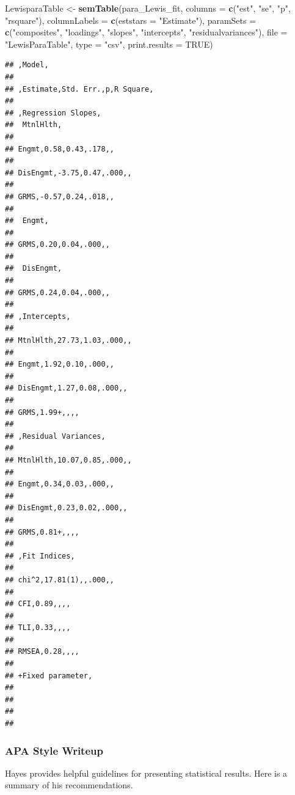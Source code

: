 \documentclass[
  11pt,
]{book}
\newenvironment{Shaded}{\begin{snugshade}}{\end{snugshade}}
\newcommand{\AttributeTok}[1]{\textcolor[rgb]{0.27,0.27,0.27}{#1}}
\newcommand{\ConstantTok}[1]{\textcolor[rgb]{0.37,0.37,0.37}{#1}}
\newcommand{\FunctionTok}[1]{\textcolor[rgb]{0.27,0.27,0.27}{\textbf{#1}}}
\newcommand{\NormalTok}[1]{#1}
\newcommand{\OtherTok}[1]{\textcolor[rgb]{0.37,0.37,0.37}{#1}}
\newcommand{\StringTok}[1]{\textcolor[rgb]{0.5,0.5,0.5}{#1}}
\begin{document}
\begin{Shaded}
\begin{Highlighting}[]
\NormalTok{LewisparaTable }\OtherTok{\textless{}{-}} \FunctionTok{semTable}\NormalTok{(para\_Lewis\_fit, }\AttributeTok{columns =} \FunctionTok{c}\NormalTok{(}\StringTok{"est"}\NormalTok{, }\StringTok{"se"}\NormalTok{, }\StringTok{"p"}\NormalTok{,}
    \StringTok{"rsquare"}\NormalTok{), }\AttributeTok{columnLabels =} \FunctionTok{c}\NormalTok{(}\AttributeTok{eststars =} \StringTok{"Estimate"}\NormalTok{), }\AttributeTok{paramSets =} \FunctionTok{c}\NormalTok{(}\StringTok{"composites"}\NormalTok{,}
    \StringTok{"loadings"}\NormalTok{, }\StringTok{"slopes"}\NormalTok{, }\StringTok{"intercepts"}\NormalTok{, }\StringTok{"residualvariances"}\NormalTok{), }\AttributeTok{file =} \StringTok{"LewisParaTable"}\NormalTok{,}
    \AttributeTok{type =} \StringTok{"csv"}\NormalTok{, }\AttributeTok{print.results =} \ConstantTok{TRUE}\NormalTok{)}
\end{Highlighting}
\end{Shaded}

\begin{verbatim}
## ,Model,
##  
## ,Estimate,Std. Err.,p,R Square,
## 
## ,Regression Slopes,
##  MtnlHlth,
## 
## Engmt,0.58,0.43,.178,,
## 
## DisEngmt,-3.75,0.47,.000,,
## 
## GRMS,-0.57,0.24,.018,,
## 
##  Engmt,
## 
## GRMS,0.20,0.04,.000,,
## 
##  DisEngmt,
## 
## GRMS,0.24,0.04,.000,,
## 
## ,Intercepts,
## 
## MtnlHlth,27.73,1.03,.000,,
## 
## Engmt,1.92,0.10,.000,,
## 
## DisEngmt,1.27,0.08,.000,,
## 
## GRMS,1.99+,,,,
## 
## ,Residual Variances,
## 
## MtnlHlth,10.07,0.85,.000,,
## 
## Engmt,0.34,0.03,.000,,
## 
## DisEngmt,0.23,0.02,.000,,
## 
## GRMS,0.81+,,,,
## 
## ,Fit Indices,
## 
## chi^2,17.81(1),,.000,,
## 
## CFI,0.89,,,,
## 
## TLI,0.33,,,,
## 
## RMSEA,0.28,,,,
## 
## +Fixed parameter,
## 
## 
## 
## 
\end{verbatim}

\hypertarget{apa-style-writeup-1}{%
\subsubsection{APA Style Writeup}\label{apa-style-writeup-1}}

Hayes \citeyearpar{hayes_introduction_2018} provides helpful guidelines for presenting statistical results. Here is a summary of his recommendations.
\end{document}
